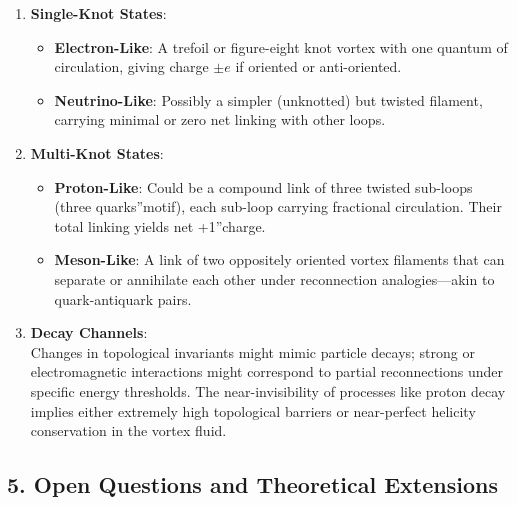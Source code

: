 \documentclass[a4paper,12pt]{article}
\begin{document}
\begin{enumerate}
    \item \textbf{Single-Knot States}:
    \begin{itemize}
        \item \textbf{Electron-Like}: A trefoil or figure-eight knot vortex with one quantum of circulation, giving charge \(\pm e\) if oriented or anti-oriented.
        \item \textbf{Neutrino-Like}: Possibly a simpler (unknotted) but twisted filament, carrying minimal or zero net linking with other loops.
    \end{itemize}
    \item \textbf{Multi-Knot States}:
    \begin{itemize}
        \item \textbf{Proton-Like}: Could be a compound link of three twisted sub-loops (\grqq three quarks\textquotedblright motif), each sub-loop carrying fractional circulation. Their total linking yields net \grqq +1\textquotedblright charge.
        \item \textbf{Meson-Like}: A link of two oppositely oriented vortex filaments that can separate or annihilate each other under reconnection analogies—akin to quark-antiquark pairs.
    \end{itemize}
    \item \textbf{Decay Channels}: \\
    Changes in topological invariants might mimic particle decays; strong or electromagnetic interactions might correspond to partial reconnections under specific energy thresholds. The near-invisibility of processes like proton decay implies either extremely high topological barriers or near-perfect helicity conservation in the vortex fluid.
\end{enumerate}

\subsection*{5. Open Questions and Theoretical Extensions}
\end{document}
